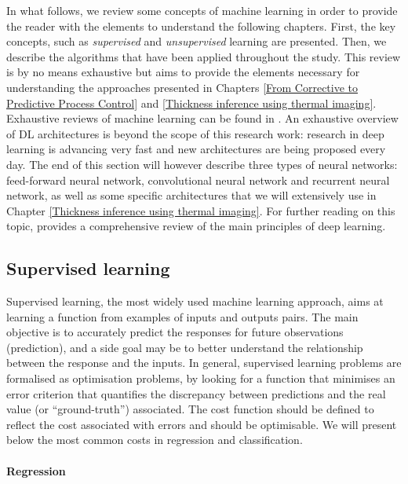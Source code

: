 In what follows, we review some concepts of machine learning in order to provide the reader with the elements to understand the following chapters. First, the key concepts, such as \textit{supervised} and \textit{unsupervised} learning are presented. Then, we describe the algorithms that have been applied throughout the study. This review is by no means exhaustive but aims to provide the elements necessary for understanding the approaches presented in Chapters \ref{From Corrective to Predictive Process Control} and \ref{Thickness inference using thermal imaging}. Exhaustive reviews of machine learning can be found in \citet{bishop2006pattern,friedman2017elements}. An exhaustive overview of DL architectures is beyond the scope of this research work: research in deep learning is advancing very fast and new architectures are being proposed every day. The end of this section will however describe three types of neural networks: feed-forward neural network, convolutional neural network and recurrent neural network, as well as some specific architectures that we will extensively use in Chapter \ref{Thickness inference using thermal imaging}. For further reading on this topic, \citet{goodfellow2016deep} provides a comprehensive review of the main principles of deep learning. 


\subsection{Supervised learning}

Supervised learning, the most widely used machine learning approach, aims at learning a function from examples of inputs and outputs pairs. The main objective is to accurately predict the responses for future observations (prediction), and a side goal may be to better understand the relationship between the response and the inputs. In general, supervised learning problems are formalised as optimisation problems, by looking for a function that minimises an error criterion that quantifies the discrepancy between predictions and the real value (or “ground-truth”) associated. The cost function should be defined to reflect the cost associated with errors and should be optimisable. We will present below the most common costs in regression and classification.

\paragraph{Regression} \label{Regression}

